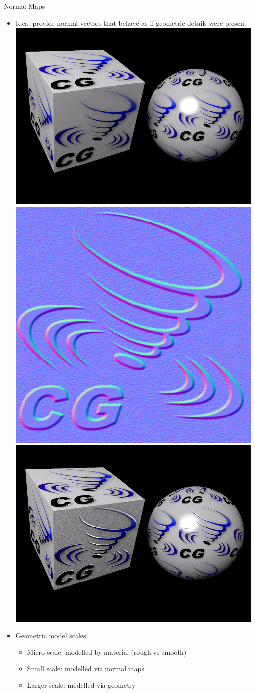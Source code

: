 \documentclass[utf8,stillsansserifmath,fleqn,t]{beamer}
\begin{document}
\begin{frame}[label=normal-maps-1]
\frametitle{\insertsection}
Normal Maps
\begin{itemize}
\item Idea: provide normal vectors that behave as if geometric details were
present\\
\includegraphics[height=.23\textwidth]{./fig/normalmap-idea-1.png} \hfill \raisebox{12mm}{$+$} \hfill
\includegraphics[height=.23\textwidth]{./fig/normalmap-idea-2.png} \hfill \raisebox{12mm}{$=$} \hfill
\includegraphics[height=.23\textwidth]{./fig/normalmap-idea-3.png}
\item Geometric model scales:
    \begin{itemize}
    \item Micro scale: modelled by material (rough vs smooth)
    \item Small scale: modelled via normal maps
    \item Larger scale: modelled via geometry
    \end{itemize}
\end{itemize}
\end{frame}
\end{document}
